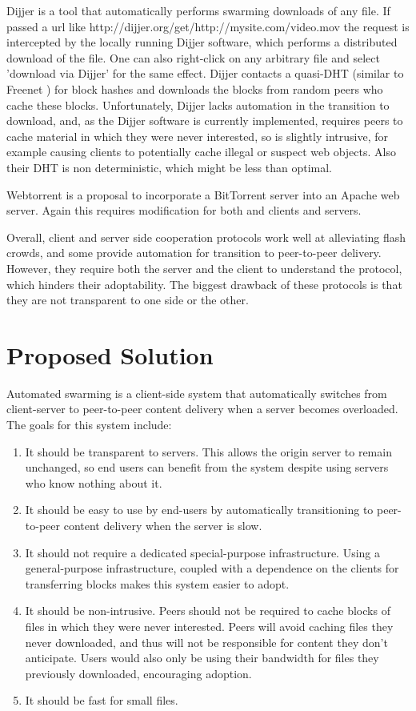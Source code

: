 Dijjer \cite{dijjer} is a tool that automatically performs swarming downloads of any file.  If passed a url like http://dijjer.org/get/http://mysite.com/video.mov the request is intercepted by the locally running Dijjer software, which performs a distributed download of the file.  One can also right-click on any arbitrary file and select 'download via Dijjer' for the same effect.  Dijjer contacts a quasi-DHT (similar to Freenet \cite{freenet}) for block hashes and downloads the blocks from random peers who cache these blocks.  Unfortunately, Dijjer lacks automation in the transition to download, and, as the Dijjer software is currently implemented, requires peers to cache material in which they were never interested, so is slightly intrusive, for example causing clients to potentially cache illegal or suspect web objects.  Also their DHT is non deterministic, which might be less than optimal.

Webtorrent \cite{webtorrent} is a proposal to incorporate a BitTorrent server into an Apache web server.  Again this requires modification for both and clients and servers.

Overall, client and server side cooperation protocols work well at alleviating flash crowds, and some provide automation for transition to peer-to-peer delivery.  
However, they require both the server and the client to understand the protocol, which hinders their adoptability.  
The biggest drawback of these protocols is that they are not transparent to one side or the other.

\section {Proposed Solution}\label{section:solution}
Automated swarming is a client-side system that automatically switches from client-server to peer-to-peer content delivery when a server becomes overloaded.  The goals for this system include:
\begin{enumerate}
\item It should be transparent to servers.  This allows the origin server to remain unchanged, so end users can benefit from the system despite using servers who know nothing about it.
\item It should be easy to use by end-users by automatically transitioning to peer-to-peer content delivery when the server is slow.
\item It should not require a dedicated special-purpose infrastructure.  Using a general-purpose infrastructure, coupled with a dependence on the clients for transferring blocks 
makes this system easier to adopt.
\item It should be non-intrusive.  Peers should not be required to cache blocks of files in which they were never interested.  
Peers will avoid caching files they never downloaded, and thus will not be responsible for content they don't anticipate.  
Users would also only be using their bandwidth for files they previously downloaded, encouraging adoption.
\item It should be fast for small files.
\end{enumerate}


